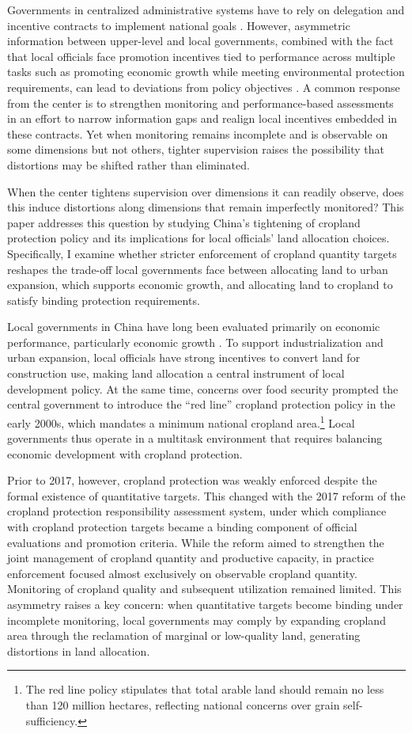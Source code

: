 Governments in centralized administrative systems have to rely on delegation and incentive contracts to implement national goals \citep{williamson1985economic}. However, asymmetric information between upper-level and local governments, combined with the fact that local officials face promotion incentives tied to performance across multiple tasks such as promoting economic growth while meeting environmental protection requirements, can lead to deviations from policy objectives \citep{holmstrom1991multitask, chen2018career}. A common response from the center is to strengthen monitoring and performance-based assessments in an effort to narrow information gaps and realign local incentives embedded in these contracts. Yet when monitoring remains incomplete and is observable on some dimensions but not others, tighter supervision raises the possibility that distortions may be shifted rather than eliminated.

When the center tightens supervision over dimensions it can readily observe, does this induce distortions along dimensions that remain imperfectly monitored? This paper addresses this question by studying China’s tightening of cropland protection policy and its implications for local officials’ land allocation choices. Specifically, I examine whether stricter enforcement of cropland quantity targets reshapes the trade-off local governments face between allocating land to urban expansion, which supports economic growth, and allocating land to cropland to satisfy binding protection requirements.

Local governments in China have long been evaluated primarily on economic performance, particularly economic growth \citep{fan2025land}. To support industrialization and urban expansion, local officials have strong incentives to convert land for construction use, making land allocation a central instrument of local development policy. At the same time, concerns over food security prompted the central government to introduce the “red line” cropland protection policy in the early 2000s, which mandates a minimum national cropland area.\footnote{The red line policy stipulates that total arable land should remain no less than 120 million hectares, reflecting national concerns over grain self-sufficiency.} Local governments thus operate in a multitask environment that requires balancing economic development with cropland protection.

Prior to 2017, however, cropland protection was weakly enforced despite the formal existence of quantitative targets. This changed with the 2017 reform of the cropland protection responsibility assessment system, under which compliance with cropland protection targets became a binding component of official evaluations and promotion criteria. While the reform aimed to strengthen the joint management of cropland quantity and productive capacity, in practice enforcement focused almost exclusively on observable cropland quantity. Monitoring of cropland quality and subsequent utilization remained limited. This asymmetry raises a key concern: when quantitative targets become binding under incomplete monitoring, local governments may comply by expanding cropland area through the reclamation of marginal or low-quality land, generating distortions in land allocation.


